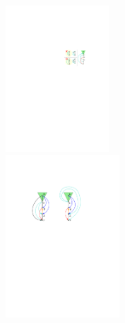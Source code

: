 \begin{paracol}{2}


\switchcolumn
\vspace{2.\intextsep}
\includegraphics[width=0.29\textwidth]{figures/forbidden_fringe2.pdf}\\
\vspace{0.5\intextsep}
\centering
\includegraphics[width=0.32\textwidth]{figures/proof_onions.pdf}
\end{paracol}






